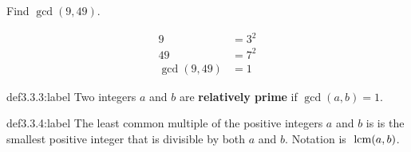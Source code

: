 \begin{problem}
    Find $\gcd(9,49).$

    $$
    \begin{aligned}
        9 &= 3^2\\
        49 &= 7^2\\
        \gcd(9,49) &= 1
    \end{aligned}
    $$
\end{problem}


\begin{definition}{def3.3.3:label}
    Two integers $a$ and $b$ are \textbf{relatively prime} if $\gcd(a,b) = 1$.
\end{definition}


\begin{definition}{def3.3.4:label}
    The least common multiple of the positive integers $a$ and $b$ is is the smallest positive integer that is divisible by both $a$ and $b$. Notation is $\text{ lcm}(a,b)$.
\end{definition}